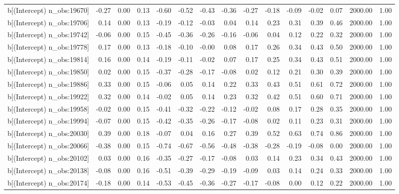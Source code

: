 \begin{table}[ht]
\begin{tabular}{rrrrrrrrrrrrrrr}
  b[(Intercept) n\_obs:19670] & -0.27 & 0.00 & 0.13 & -0.60 & -0.52 & -0.43 & -0.36 & -0.27 & -0.18 & -0.09 & -0.02 & 0.07 & 2000.00 & 1.00 \\ 
  b[(Intercept) n\_obs:19706] & 0.14 & 0.00 & 0.13 & -0.19 & -0.12 & -0.03 & 0.04 & 0.14 & 0.23 & 0.31 & 0.39 & 0.46 & 2000.00 & 1.00 \\ 
  b[(Intercept) n\_obs:19742] & -0.06 & 0.00 & 0.15 & -0.45 & -0.36 & -0.26 & -0.16 & -0.06 & 0.04 & 0.12 & 0.22 & 0.32 & 2000.00 & 1.00 \\ 
  b[(Intercept) n\_obs:19778] & 0.17 & 0.00 & 0.13 & -0.18 & -0.10 & -0.00 & 0.08 & 0.17 & 0.26 & 0.34 & 0.43 & 0.50 & 2000.00 & 1.00 \\ 
  b[(Intercept) n\_obs:19814] & 0.16 & 0.00 & 0.14 & -0.19 & -0.11 & -0.02 & 0.07 & 0.17 & 0.25 & 0.34 & 0.43 & 0.51 & 2000.00 & 1.00 \\ 
  b[(Intercept) n\_obs:19850] & 0.02 & 0.00 & 0.15 & -0.37 & -0.28 & -0.17 & -0.08 & 0.02 & 0.12 & 0.21 & 0.30 & 0.39 & 2000.00 & 1.00 \\ 
  b[(Intercept) n\_obs:19886] & 0.33 & 0.00 & 0.15 & -0.06 & 0.05 & 0.14 & 0.22 & 0.33 & 0.43 & 0.51 & 0.61 & 0.72 & 2000.00 & 1.00 \\ 
  b[(Intercept) n\_obs:19922] & 0.32 & 0.00 & 0.14 & -0.02 & 0.05 & 0.14 & 0.23 & 0.32 & 0.42 & 0.51 & 0.60 & 0.71 & 2000.00 & 1.00 \\ 
  b[(Intercept) n\_obs:19958] & -0.02 & 0.00 & 0.15 & -0.41 & -0.32 & -0.22 & -0.12 & -0.02 & 0.08 & 0.17 & 0.28 & 0.35 & 2000.00 & 1.00 \\ 
  b[(Intercept) n\_obs:19994] & -0.07 & 0.00 & 0.15 & -0.42 & -0.35 & -0.26 & -0.17 & -0.08 & 0.02 & 0.11 & 0.23 & 0.31 & 2000.00 & 1.00 \\ 
  b[(Intercept) n\_obs:20030] & 0.39 & 0.00 & 0.18 & -0.07 & 0.04 & 0.16 & 0.27 & 0.39 & 0.52 & 0.63 & 0.74 & 0.86 & 2000.00 & 1.00 \\ 
  b[(Intercept) n\_obs:20066] & -0.38 & 0.00 & 0.15 & -0.74 & -0.67 & -0.56 & -0.48 & -0.38 & -0.28 & -0.19 & -0.08 & 0.00 & 2000.00 & 1.00 \\ 
  b[(Intercept) n\_obs:20102] & 0.03 & 0.00 & 0.16 & -0.35 & -0.27 & -0.17 & -0.08 & 0.03 & 0.14 & 0.23 & 0.34 & 0.43 & 2000.00 & 1.00 \\ 
  b[(Intercept) n\_obs:20138] & -0.08 & 0.00 & 0.16 & -0.51 & -0.39 & -0.29 & -0.19 & -0.09 & 0.03 & 0.14 & 0.24 & 0.33 & 2000.00 & 1.00 \\ 
  b[(Intercept) n\_obs:20174] & -0.18 & 0.00 & 0.14 & -0.53 & -0.45 & -0.36 & -0.27 & -0.17 & -0.08 & 0.00 & 0.12 & 0.22 & 2000.00 & 1.00 \\ 

\end{tabular}
\end{table}
